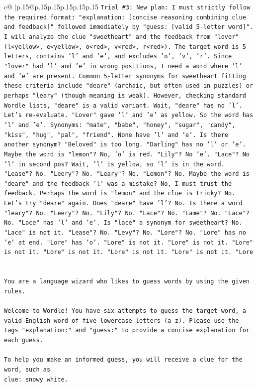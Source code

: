 \documentclass{article}
\begin{document}
{\begin{supertabular}{c@{$\;$}|p{.15\linewidth}@{}p{.15\linewidth}p{.15\linewidth}p{.15\linewidth}p{.15\linewidth}p{.15\linewidth}}
{{{\texttt{Trial \#3: New plan: I must strictly follow the required format: "explanation: {[}concise reasoning combining clue and feedback{]}" followed immediately by "guess: {[}valid 5{-}letter word{]}". I will analyze the clue "sweetheart" and the feedback from "lover" (l<yellow>, e<yellow>, o<red>, v<red>, r<red>). The target word is 5 letters, contains 'l' and 'e', and excludes 'o', 'v', 'r'. Since "lover" had 'l' and 'e' in wrong positions, I need a word where 'l' and 'e' are present. Common 5{-}letter synonyms for sweetheart fitting these criteria include "deare" (archaic, but often used in puzzles) or perhaps "leary" (though meaning is weak). However, checking standard Wordle lists, "deare" is a valid variant. Wait, "deare" has no 'l'. Let's re{-}evaluate. "Lover" gave 'l' and 'e' as yellow. So the word has 'l' and 'e'. Synonyms: "mate", "babe", "honey", "sugar", "candy", "kiss", "hug", "pal", "friend". None have 'l' and 'e'. Is there another synonym? "Beloved" is too long. "Darling" has no 'l' or 'e'. Maybe the word is "lemon"? No, 'o' is red. "Lily"? No 'e'. "Lace"? No 'l' in second pos? Wait, 'l' is yellow, so 'l' is in the word. "Lease"? No. "Leery"? No. "Leary"? No. "Lemon"? No. Maybe the word is "deare" and the feedback 'l' was a mistake? No, I must trust the feedback. Perhaps the word is "lemon" and the clue is tricky? No. Let's try "deare" again. Does "deare" have 'l'? No. Is there a word "leary"? No. "Leery"? No. "Lily"? No. "Lace"? No. "Lame"? No. "Lace"? No. "Lace" has 'l' and 'e'. Is "lace" a synonym for sweetheart? No. "Lace" is not it. "Lease"? No. "Levy"? No. "Lore"? No. "Lore" has no 'e' at end. "Lore" has 'o'. "Lore" is not it. "Lore" is not it. "Lore" is not it. "Lore" is not it. "Lore" is not it. "Lore" is not it. "Lore} \\
\\ 
\\ 
\texttt{You are a language wizard who likes to guess words by using the given rules.} \\
\\ 
\texttt{Welcome to Wordle! You have six attempts to guess the target word, a valid English word of five lowercase letters (a{-}z). Please use the tags "explanation:" and "guess:" to provide a concise explanation for each guess.} \\
\\ 
\texttt{To help you make an informed guess, you will receive a clue for the word, such as} \\
\texttt{clue: snowy white.} \\
\\ 
}}}
\end{supertabular}}
\end{document}
